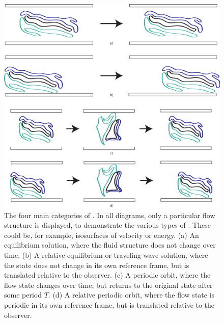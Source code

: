 \begin{figure}[h]
\centerline{\includegraphics[scale=0.5]{Figs/ECSClassification}}
\caption[The four main categories of \ecs.]{The four main categories of \ecs. In all diagrams, only a particular flow structure is displayed, to demonstrate the various types of \ecs. These could be, for example, isosurfaces of velocity or energy. (a) An {equilibrium} solution, where the fluid structure does not change over time. (b) A {relative equilibrium} or {traveling wave} solution, where the state does not change in its own reference frame, but is translated relative to the observer. (c) A {periodic orbit}, where the flow state changes over time, but returns to the original state after some period $T$. (d) A {relative periodic orbit}, where the flow state is periodic in its own reference frame, but is translated relative to the observer.}\label{fig:ECS}
\end{figure}



